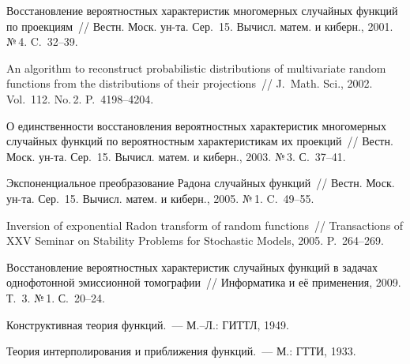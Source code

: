 \begin{multicols}{2}
{{\begin{thebibliography}{99}
 Восстановление вероятностных
характеристик многомерных случайных функций по проекциям~// Вестн.
Моск. ун-та. Сер.~15. Вычисл. матем. и киберн., 2001. №\,4. C.~32--39.

 An algorithm to reconstruct probabilistic
distributions of multivariate random functions from the
distributions of their projections~// J.~Math.
Sci., 2002. Vol.~112. No.\,2. P.~4198--4204.

 О единственности восстановления вероятностных
характеристик многомерных случайных функций по вероятностным
характеристикам их проекций~// Вестн. Моск. ун-та. Сер.~15. Вычисл.
матем. и киберн., 2003. №\,3. С.~37--41.


 Экспоненциальное преобразование
Радона случайных функций~// Вестн. Моск. ун-та. Сер.~15. Вычисл.
матем. и киберн., 2005. №\,1. C.~49--55.

 Inversion of exponential Radon transform of
random func\-tions~// Transactions of XXV Seminar on Stability
Problems for Stochastic Models, 2005. P.~264--269.

 Восстановление вероятностных характеристик
случайных функций в задачах однофотонной эмиссионной томографии~//
Информатика и её применения, 2009. Т.~3. №\,1. С.~20--24.

 Конструктивная теория функций.~--- М.--Л.: ГИТТЛ, 1949.

\label{end\stat}

 Теория интерполирования и приближения функций.~---
М.: ГТТИ, 1933.
 \end{thebibliography}
}
}


\end{multicols}       
